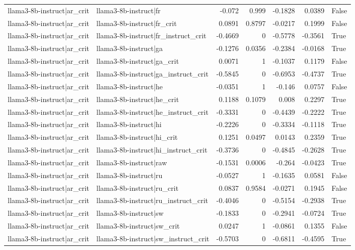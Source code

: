 \begin{table}
\begin{tabular}{l l r r r r l}
llama3-8b-instruct|ar_crit & llama3-8b-instruct|fr & -0.072 & 0.999 & -0.1828 & 0.0389 & False \\
llama3-8b-instruct|ar_crit & llama3-8b-instruct|fr_crit & 0.0891 & 0.8797 & -0.0217 & 0.1999 & False \\
llama3-8b-instruct|ar_crit & llama3-8b-instruct|fr_instruct_crit & -0.4669 & 0 & -0.5778 & -0.3561 & True \\
llama3-8b-instruct|ar_crit & llama3-8b-instruct|ga & -0.1276 & 0.0356 & -0.2384 & -0.0168 & True \\
llama3-8b-instruct|ar_crit & llama3-8b-instruct|ga_crit & 0.0071 & 1 & -0.1037 & 0.1179 & False \\
llama3-8b-instruct|ar_crit & llama3-8b-instruct|ga_instruct_crit & -0.5845 & 0 & -0.6953 & -0.4737 & True \\
llama3-8b-instruct|ar_crit & llama3-8b-instruct|he & -0.0351 & 1 & -0.146 & 0.0757 & False \\
llama3-8b-instruct|ar_crit & llama3-8b-instruct|he_crit & 0.1188 & 0.1079 & 0.008 & 0.2297 & True \\
llama3-8b-instruct|ar_crit & llama3-8b-instruct|he_instruct_crit & -0.3331 & 0 & -0.4439 & -0.2222 & True \\
llama3-8b-instruct|ar_crit & llama3-8b-instruct|hi & -0.2226 & 0 & -0.3334 & -0.1118 & True \\
llama3-8b-instruct|ar_crit & llama3-8b-instruct|hi_crit & 0.1251 & 0.0497 & 0.0143 & 0.2359 & True \\
llama3-8b-instruct|ar_crit & llama3-8b-instruct|hi_instruct_crit & -0.3736 & 0 & -0.4845 & -0.2628 & True \\
llama3-8b-instruct|ar_crit & llama3-8b-instruct|raw & -0.1531 & 0.0006 & -0.264 & -0.0423 & True \\
llama3-8b-instruct|ar_crit & llama3-8b-instruct|ru & -0.0527 & 1 & -0.1635 & 0.0581 & False \\
llama3-8b-instruct|ar_crit & llama3-8b-instruct|ru_crit & 0.0837 & 0.9584 & -0.0271 & 0.1945 & False \\
llama3-8b-instruct|ar_crit & llama3-8b-instruct|ru_instruct_crit & -0.4046 & 0 & -0.5154 & -0.2938 & True \\
llama3-8b-instruct|ar_crit & llama3-8b-instruct|sw & -0.1833 & 0 & -0.2941 & -0.0724 & True \\
llama3-8b-instruct|ar_crit & llama3-8b-instruct|sw_crit & 0.0247 & 1 & -0.0861 & 0.1355 & False \\
llama3-8b-instruct|ar_crit & llama3-8b-instruct|sw_instruct_crit & -0.5703 & 0 & -0.6811 & -0.4595 & True \\

\end{tabular}
\end{table}
